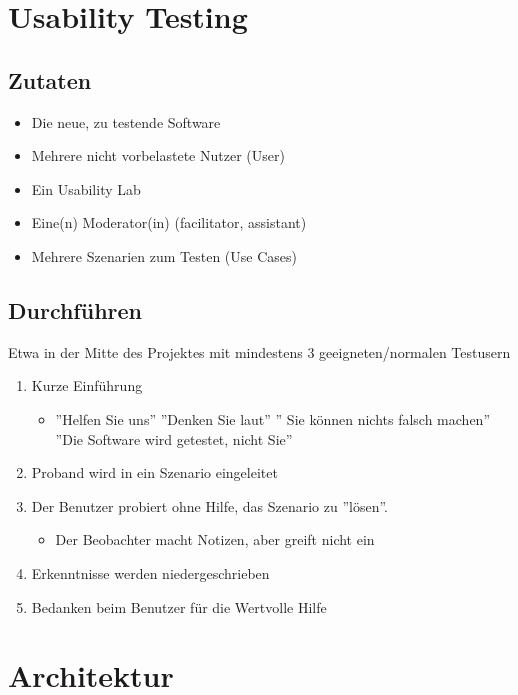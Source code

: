\section{Usability Testing}

\subsection{Zutaten}

\begin{itemize}
	\item Die neue, zu testende Software
	\item Mehrere nicht vorbelastete Nutzer (User)
	\item Ein Usability Lab
	\item Eine(n) Moderator(in) (facilitator, assistant)
	\item Mehrere Szenarien zum Testen (Use Cases)
\end{itemize}

\subsection{Durchführen}


Etwa in der Mitte des Projektes mit mindestens 3 geeigneten/normalen Testusern

\begin{enumerate}
	\item Kurze Einführung \begin{itemize}
		\item ''Helfen Sie uns'' ''Denken Sie laut'' '' Sie können nichts falsch machen'' ''Die Software wird getestet, nicht Sie''
	\end{itemize}
	\item Proband wird in ein Szenario eingeleitet
	\item Der Benutzer probiert ohne Hilfe, das Szenario zu ''lösen''. \begin{itemize}
		\item Der Beobachter macht Notizen, aber greift nicht ein
	\end{itemize}
	\item Erkenntnisse werden niedergeschrieben
	\item Bedanken beim Benutzer für die Wertvolle Hilfe
\end{enumerate}

\section{Architektur}

